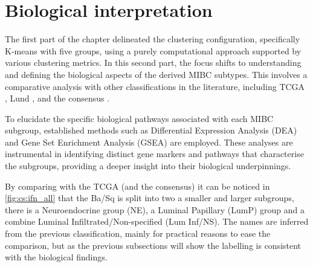 \section{Biological interpretation} \label{s:cs:bio_interp}



The first part of the chapter delineated the clustering configuration, specifically K-means with five groups, using a purely computational approach supported by various clustering metrics. In this second part, the focus shifts to understanding and defining the biological aspects of the derived MIBC subtypes. This involves a comparative analysis with other classifications in the literature, including TCGA \cite{Robertson2017-mg}, Lund \citet{Marzouka2018-ge}, and the consensus \citet{Kamoun2020-tj}.

To elucidate the specific biological pathways associated with each MIBC subgroup, established methods such as Differential Expression Analysis (DEA) and Gene Set Enrichment Analysis (GSEA) are employed. These analyses are instrumental in identifying distinct gene markers and pathways that characterise the subgroups, providing a deeper insight into their biological underpinnings.


By comparing with the TCGA \citet{Robertson2017-mg} (and the consensus) it can be noticed in \cref{fig:cs:ifn_all} that the Ba/Sq is split into two a smaller and larger subgroups, there is a Neuroendocrine group (NE), a Luminal Papillary (LumP) group and a combine Luminal Infiltrated/Non-specified (Lum Inf/NS). The names are inferred from the previous classification, mainly for practical reasons to ease the comparison, but as the previous subsections will show the labelling is consistent with the biological findings.


